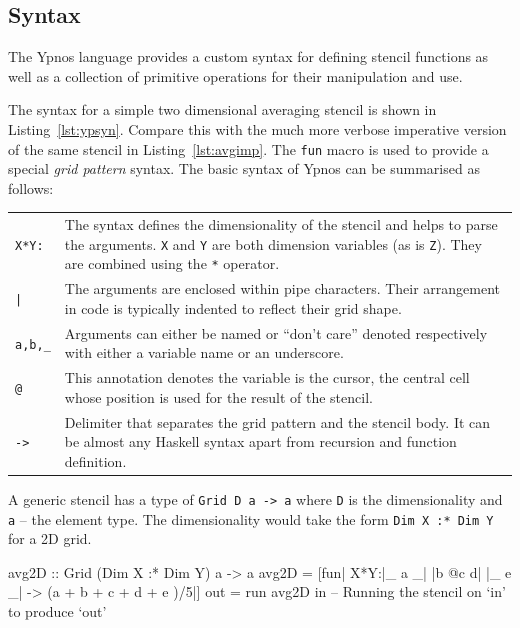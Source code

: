 \documentclass[12pt,a4paper,twoside]{scrbook}
\begin{document}
\subsection{Syntax}

The Ypnos language provides a custom syntax for defining stencil functions as
well as a collection of primitive operations for their manipulation and use.

The syntax for a simple two dimensional averaging stencil is shown in
Listing~\ref{lst:ypsyn}. Compare this with the much more verbose imperative
version of the same stencil in Listing~\ref{lst:avgimp}.  The \texttt{fun} macro
is used to provide a special \emph{grid pattern} syntax. The basic syntax of
Ypnos can be summarised as follows:

\begin{tabular}{p{} p{}}

\texttt{X*Y:} & The syntax defines the dimensionality of the stencil and helps
to parse the arguments. \texttt{X} and \texttt{Y} are both dimension variables
(as is \texttt{Z}). They are combined using the \texttt{*} operator.  \\

\texttt{|} & The arguments are enclosed within pipe characters.  Their
arrangement in code is typically indented to reflect their grid shape.  \\

\texttt{a,b,\_} & Arguments can either be named or ``don't care'' denoted
respectively with either a variable name or an underscore.  \\

\texttt{@} & This annotation denotes the variable is the cursor, the central
cell whose position is used for the result of the stencil.  \\

\texttt{->} & Delimiter that separates the grid pattern and the stencil body. It
can be almost any Haskell syntax apart from recursion and function definition.
\\

\end{tabular}

A generic stencil has a type of \texttt{Grid D a -> a} where \texttt{D} is the
dimensionality and \texttt{a} -- the element type. The dimensionality would take
the form \texttt{Dim X :* Dim Y} for a 2D grid.

\begin{hflisting}[label={lst:ypsyn},caption={A simple mean function. Computes
    the mean of the neighbourhood of cells.}]
avg2D :: Grid (Dim X :* Dim Y) a -> a
avg2D = [fun| X*Y:|_  a _|
                  |b @c d|
                  |_  e _| -> (a + b + c + d + e )/5|]
out = run avg2D in -- Running the stencil on `in' to produce `out'

\end{hflisting}
\end{document}
